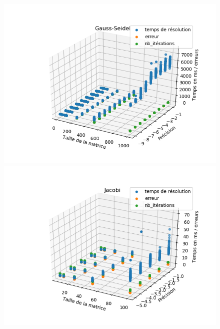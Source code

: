 
\begin{figure}
	\begin{minipage}[t]{0.5\linewidth}
	\includegraphics[width=\linewidth]{../codes/Data/gauss-seidel3D.png}
	\end{minipage}
	\begin{minipage}[t]{0.5\linewidth}
	\includegraphics[width=\linewidth]{../codes/Data/jacobi3D.png}
	\end{minipage}
	\begin{minipage}[t]{0.5\linewidth}

\end{minipage}
\end{figure}
